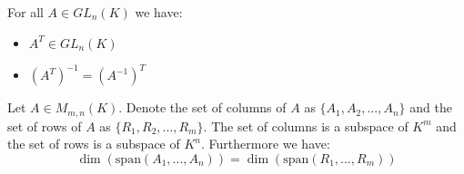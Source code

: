     \begin{property}
		For all $A\in GL_n(K)$ we have:
        \begin{itemize}
			\item $A^T\in GL_n(K)$
            \item $\left(A^T\right)^{-1}=\left(A^{-1}\right)^T$
		\end{itemize}
	\end{property}
    
	\begin{property}\label{linalgebra:dim_columns_rows}
		Let $A\in M_{m,n}(K)$. Denote the set of columns of $A$ as $\{A_1, A_2, ..., A_n\}$ and the set of rows of $A$ as $\{R_1, R_2, ..., R_m\}$. The set of columns is a subspace of $K^m$ and the set of rows is a subspace of $K^n$. Furthermore we have:
		\[
			\dim(\text{span}(A_1, ..., A_n)) = \dim(\text{span}(R_1, ..., R_m))
		\]
	\end{property}
	
    
